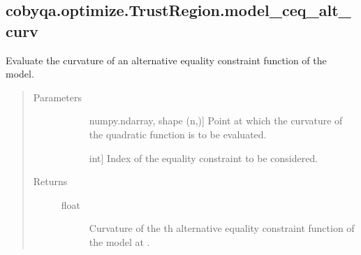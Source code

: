 \documentclass[letterpaper,10pt,english]{sphinxmanual}
\begin{document}
\begin{fulllineitems}
\begin{fulllineitems}
\end{fulllineitems}



\subsection{cobyqa.optimize.TrustRegion.model\_ceq\_alt\_curv}
\label{\detokenize{refs/generated/cobyqa.optimize.TrustRegion.model_ceq_alt_curv:cobyqa-optimize-trustregion-model-ceq-alt-curv}}\label{\detokenize{refs/generated/cobyqa.optimize.TrustRegion.model_ceq_alt_curv::doc}}

\begin{fulllineitems}
\label{\detokenize{refs/generated/cobyqa.optimize.TrustRegion.model_ceq_alt_curv:cobyqa.optimize.TrustRegion.model_ceq_alt_curv}}
\sphinxAtStartPar
Evaluate the curvature of an alternative equality constraint function of
the model.
\begin{quote}\begin{description}
\item[{Parameters}] \leavevmode\begin{description}
\item[{}] \leavevmode{[}numpy.ndarray, shape (n,){]}
\sphinxAtStartPar
Point at which the curvature of the quadratic function is to be
evaluated.

\item[{}] \leavevmode{[}int{]}
\sphinxAtStartPar
Index of the equality constraint to be considered.

\end{description}

\item[{Returns}] \leavevmode\begin{description}
\item[{float}] \leavevmode
\sphinxAtStartPar
Curvature of the \sphinxhyphen{}th alternative equality constraint function of
the model at .

\end{description}

\end{description}\end{quote}


\end{fulllineitems}
\end{fulllineitems}
\end{document}
